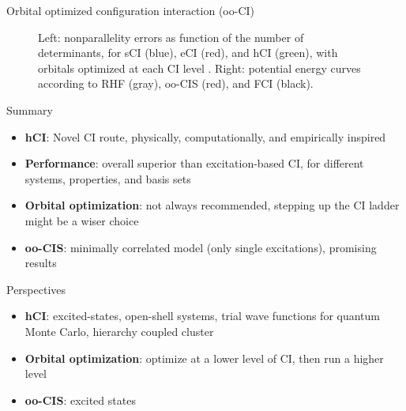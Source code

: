 \documentclass[final]{beamer}
\newlength{\colwidth}
\begin{document}
\begin{frame}[t]
\begin{columns}[t]
\begin{column}{\colwidth}
\begin{block}{Orbital optimized configuration interaction (oo-CI)}
\begin{figure}
    \caption{Left: nonparallelity errors as function of the number of determinants, for sCI (blue), eCI (red), and hCI (green), with orbitals optimized at each CI level \cite{Damour_2021}.
Right: potential energy curves according to RHF (gray), oo-CIS (red), and FCI (black).}
    \label{fig:plot_ooCI}
  \end{figure}
\end{block}

\vspace{-1.5cm}
\begin{block}{Summary}
  \vspace{-0.5cm}
  \begin{itemize}
    \item {\bf hCI}: Novel CI route, physically, computationally, and empirically inspired
    \item {\bf Performance}: overall superior than excitation-based CI, for different systems, properties, and basis sets
    \item {\bf Orbital optimization}: not always recommended, stepping up the CI ladder might be a wiser choice
    \item {\bf oo-CIS}: minimally correlated model (only single excitations), promising results
  \end{itemize}
\end{block}

\vspace{-1.5cm}
\begin{block}{Perspectives}
  \vspace{-0.5cm}
  \begin{itemize}
    \item {\bf hCI}: excited-states, open-shell systems, trial wave functions for quantum Monte Carlo, hierarchy coupled cluster
    \item {\bf Orbital optimization}: optimize at a lower level of CI, then run a higher level
    \item {\bf oo-CIS}: excited states
  \end{itemize}
\end{block}


\end{column}
\end{columns}
\end{frame}
\end{document}

